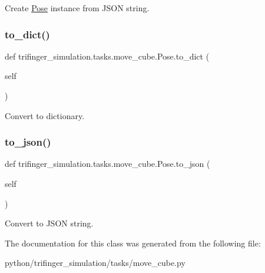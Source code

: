 Create \hyperlink{classtrifinger__simulation_1_1tasks_1_1move__cube_1_1Pose}{Pose} instance from J\+S\+ON string. 

\mbox{\label{classtrifinger__simulation_1_1tasks_1_1move__cube_1_1Pose_a6c289faff4a6bb495580fe3851b7bdac}} 
\subsubsection{\texorpdfstring{to\+\_\+dict()}{to\_dict()}}
{\footnotesize\ttfamily def trifinger\+\_\+simulation.\+tasks.\+move\+\_\+cube.\+Pose.\+to\+\_\+dict (\begin{DoxyParamCaption}\item[{}]{self }\end{DoxyParamCaption})}



Convert to dictionary. 

\mbox{\label{classtrifinger__simulation_1_1tasks_1_1move__cube_1_1Pose_ad7c514c49a45c669e4b22874a33d34f5}} 
\subsubsection{\texorpdfstring{to\+\_\+json()}{to\_json()}}
{\footnotesize\ttfamily def trifinger\+\_\+simulation.\+tasks.\+move\+\_\+cube.\+Pose.\+to\+\_\+json (\begin{DoxyParamCaption}\item[{}]{self }\end{DoxyParamCaption})}



Convert to J\+S\+ON string. 



The documentation for this class was generated from the following file\+:\begin{DoxyCompactItemize}
\item 
python/trifinger\+\_\+simulation/tasks/move\+\_\+cube.\+py\end{DoxyCompactItemize}

